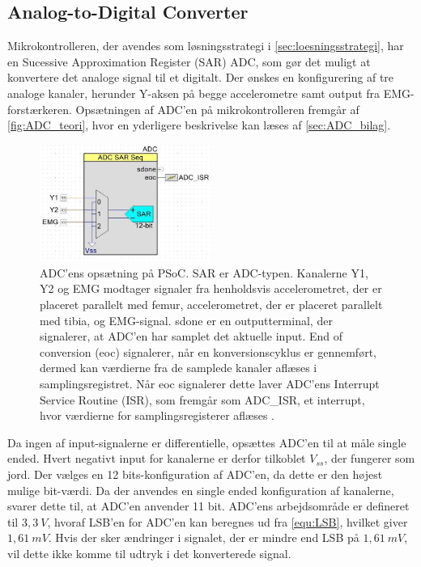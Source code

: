\subsection{Analog-to-Digital Converter} \label{sec:ADC_imp}
Mikrokontrolleren, der avendes som løsningsstrategi i \autoref{sec:loesningsstrategi}, har en Sucessive Approximation Register (SAR) ADC, som gør det muligt at konvertere det analoge signal til et digitalt. 
Der ønskes en konfigurering af tre analoge kanaler, herunder Y-aksen på begge accelerometre samt output fra EMG-forstærkeren. 
Opsætningen af ADC'en på mikrokontrolleren fremgår af \autoref{fig:ADC_teori}, hvor en yderligere beskrivelse kan læses af \autoref{sec:ADC_bilag}.

\begin{figure}[H]
\centering
\includegraphics[width=0.5\textwidth]{figures/implementering/ADC_imp.jpg}
\caption{ADC'ens opsætning på PSoC. SAR er ADC-typen. Kanalerne Y1, Y2 og EMG modtager signaler fra henholdsvis accelerometret, der er placeret parallelt med femur, accelerometret, der er placeret parallelt med tibia, og EMG-signal. sdone er en outputterminal, der signalerer, at ADC'en har samplet det aktuelle input. End of conversion (eoc) signalerer, når en konversionscyklus er gennemført, dermed kan værdierne fra de samplede kanaler aflæses i samplingsregistret. Når eoc signalerer dette laver ADC'ens Interrupt Service Routine (ISR), som fremgår som ADC\_ISR, et interrupt, hvor værdierne for samplingsregisterer aflæses \citep{ADC2014}.}
\label{fig:ADC_teori}
\end{figure}

\noindent
Da ingen af input-signalerne er differentielle, opsættes ADC'en til at måle single ended. Hvert negativt input for kanalerne er derfor tilkoblet $V_{ss}$, der fungerer som jord. 
Der vælges en 12 bits-konfiguration af ADC'en, da dette er den højest mulige bit-værdi.
Da der anvendes en single ended konfiguration af kanalerne, svarer dette til, at ADC'en anvender 11 bit. 
ADC'ens arbejdsområde er defineret til $3,3~V$, hvoraf LSB'en for ADC'en kan beregnes ud fra \autoref{equ:LSB}, hvilket giver $1,61~mV$. 
Hvis der sker ændringer i signalet, der er mindre end LSB på $1,61~mV$, vil dette ikke komme til udtryk i det konverterede signal. 

